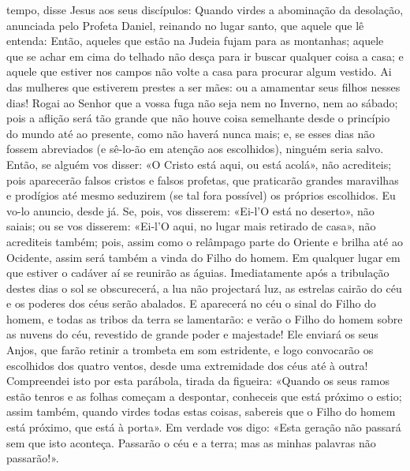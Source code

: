 \begin{paracol}{2}
{ tempo, disse Jesus aos seus discípulos: Quando virdes a abominação da desolação, anunciada pelo Profeta Daniel, reinando no lugar santo, que aquele que lê entenda: Então, aqueles que estão na Judeia fujam para as montanhas; aquele que se achar em cima do telhado não desça para ir buscar qualquer coisa a casa; e aquele que estiver nos campos não volte a casa para procurar algum vestido. Ai das mulheres que estiverem prestes a ser mães: ou a amamentar seus filhos nesses dias! Rogai ao Senhor que a vossa fuga não seja nem no Inverno, nem ao sábado; pois a aflição será tão grande que não houve coisa semelhante desde o princípio do mundo até ao presente, como não haverá nunca mais; e, se esses dias não fossem abreviados (e sê-lo-ão em atenção aos escolhidos), ninguém seria salvo. Então, se alguém vos disser: «O Cristo está aqui, ou está acolá», não acrediteis; pois aparecerão falsos cristos e falsos profetas, que praticarão grandes maravilhas e prodígios até mesmo seduzirem (se tal fora possível) os próprios escolhidos. Eu vo-lo anuncio, desde já. Se, pois, vos disserem: «Ei-l’O está no deserto», não saiais; ou se vos disserem: «Ei-l’O aqui, no lugar mais retirado de casa», não acrediteis também; pois, assim como o relâmpago parte do Oriente e brilha até ao Ocidente, assim será também a vinda do Filho do homem. Em qualquer lugar em que estiver o cadáver aí se reunirão as águias. Imediatamente após a tribulação destes dias o sol se obscurecerá, a lua não projectará luz, as estrelas cairão do céu e os poderes dos céus serão abalados. E aparecerá no céu o sinal do Filho do homem, e todas as tribos da terra se lamentarão: e verão o Filho do homem sobre as nuvens do céu, revestido de grande poder e majestade! Ele enviará os seus Anjos, que farão retinir a trombeta em som estridente, e logo convocarão os escolhidos dos quatro ventos, desde uma extremidade dos céus até à outra! Compreendei isto por esta parábola, tirada da figueira: «Quando os seus ramos estão tenros e as folhas começam a despontar, conheceis que está próximo o estio; assim também, quando virdes todas estas coisas, sabereis que o Filho do homem está próximo, que está à porta». Em verdade vos digo: «Esta geração não passará sem que isto aconteça. Passarão o céu e a terra; mas as minhas palavras não passarão!».
}\end{paracol}

\begin{paracol}{2}\switchcolumn{}\end{paracol}

